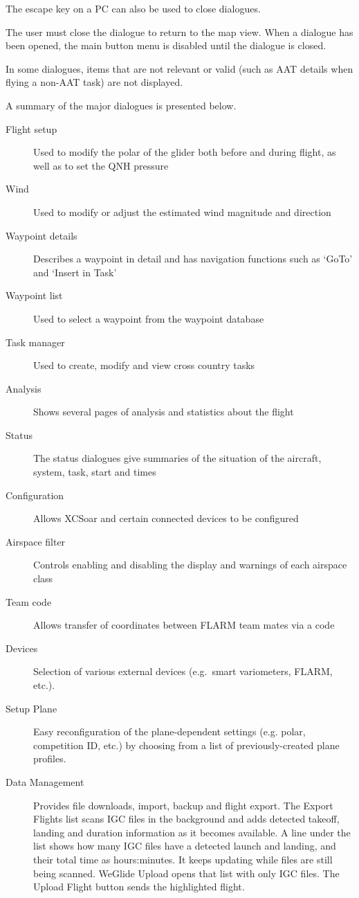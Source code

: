 The escape key on a PC can also be used to close dialogues.

The user must close the dialogue to return to the map view. When a dialogue
has been opened, the main button menu is disabled until the dialogue is closed.

In some dialogues, items that are not relevant or valid (such as AAT details when
flying a non-AAT task) are not displayed.

A summary of the major dialogues is presented below.
\begin{description}
\item[Flight setup] Used to modify the polar of the glider both before and
during flight, as well as to set the QNH pressure
\item[Wind] Used to modify or adjust the estimated wind magnitude and direction
\item[Waypoint details] Describes a waypoint in detail and has navigation
functions such as `GoTo' and `Insert in Task'
\item[Waypoint list] Used to select a waypoint from the waypoint database
\item[Task manager] Used to create, modify and view cross country tasks
\item[Analysis] Shows several pages of analysis and statistics about the flight
\item[Status] The status dialogues give summaries of the situation of the 
aircraft, system, task, start and times
\item[Configuration] Allows XCSoar and certain connected devices to be
configured
\item[Airspace filter] Controls enabling and disabling the display and warnings
of each airspace class
\item[Team code] Allows transfer of coordinates between FLARM team mates via a 
  code
\item[Devices]  Selection of various external devices (e.g.\ smart variometers,
  FLARM, etc.).
\item[Setup Plane]  Easy reconfiguration of the plane-dependent settings (e.g. 
  polar, competition ID, etc.) by choosing from a list of previously-created 
  plane profiles.
\item[Data Management] Provides file downloads, import, backup and flight
  export.  The Export Flights list scans IGC files in the background and adds
  detected takeoff, landing and duration information as it becomes available.
  A line under the list shows how many IGC files have a detected launch and
  landing, and their total time as hours:minutes. It keeps updating while
  files are still being scanned.
  WeGlide Upload opens that
  list with only IGC files. The Upload Flight button sends the
  highlighted flight.
\end{description}

